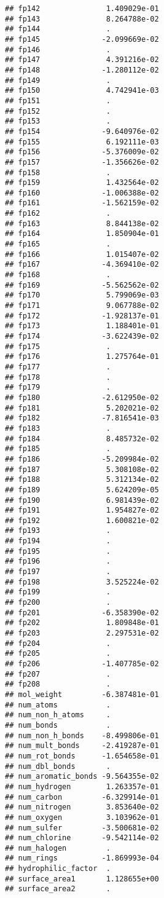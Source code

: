 \documentclass[]{article}
\begin{document}
\begin{verbatim}
## fp142               1.409029e-01
## fp143               8.264788e-02
## fp144               .           
## fp145              -2.099669e-02
## fp146               .           
## fp147               4.391216e-02
## fp148              -1.280112e-02
## fp149               .           
## fp150               4.742941e-03
## fp151               .           
## fp152               .           
## fp153               .           
## fp154              -9.640976e-02
## fp155               6.192111e-03
## fp156              -5.376009e-02
## fp157              -1.356626e-02
## fp158               .           
## fp159               1.432564e-02
## fp160              -1.006388e-02
## fp161              -1.562159e-02
## fp162               .           
## fp163               8.844138e-02
## fp164               1.850904e-01
## fp165               .           
## fp166               1.015407e-02
## fp167              -4.369410e-02
## fp168               .           
## fp169              -5.562562e-02
## fp170               5.799069e-03
## fp171               9.067788e-02
## fp172              -1.928137e-01
## fp173               1.188401e-01
## fp174              -3.622439e-02
## fp175               .           
## fp176               1.275764e-01
## fp177               .           
## fp178               .           
## fp179               .           
## fp180              -2.612950e-02
## fp181               5.202021e-02
## fp182              -7.816541e-03
## fp183               .           
## fp184               8.485732e-02
## fp185               .           
## fp186              -5.209984e-02
## fp187               5.308108e-02
## fp188               5.312134e-02
## fp189               5.624209e-05
## fp190               6.981439e-02
## fp191               1.954827e-02
## fp192               1.600821e-02
## fp193               .           
## fp194               .           
## fp195               .           
## fp196               .           
## fp197               .           
## fp198               3.525224e-02
## fp199               .           
## fp200               .           
## fp201              -6.358390e-02
## fp202               1.809848e-01
## fp203               2.297531e-02
## fp204               .           
## fp205               .           
## fp206              -1.407785e-02
## fp207               .           
## fp208               .           
## mol_weight         -6.387481e-01
## num_atoms           .           
## num_non_h_atoms     .           
## num_bonds           .           
## num_non_h_bonds    -8.499806e-01
## num_mult_bonds     -2.419287e-01
## num_rot_bonds      -1.654658e-01
## num_dbl_bonds       .           
## num_aromatic_bonds -9.564355e-02
## num_hydrogen        1.263357e-01
## num_carbon         -6.329914e-01
## num_nitrogen        3.853640e-02
## num_oxygen          3.103962e-01
## num_sulfer         -3.500681e-02
## num_chlorine       -9.542114e-02
## num_halogen         .           
## num_rings          -1.869993e-04
## hydrophilic_factor  .           
## surface_area1       1.128655e+00
## surface_area2       .
\end{verbatim}
\end{document}
